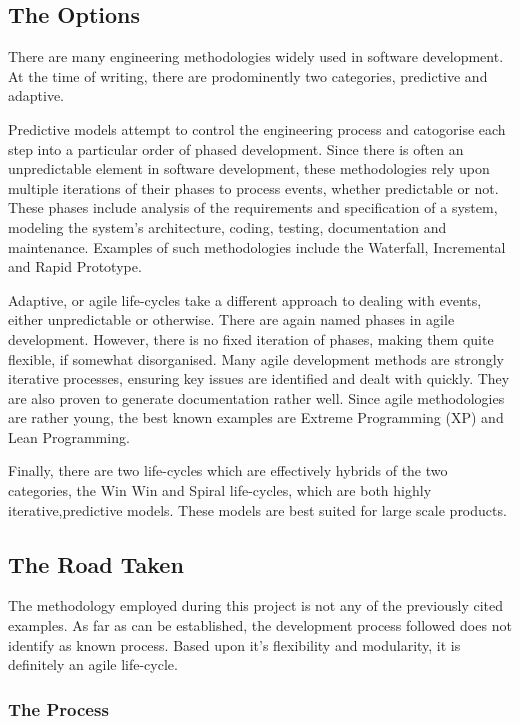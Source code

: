 
\subsection{The Options}

There are many engineering methodologies widely used in software
development. At the time of writing, there are prodominently two
categories, predictive and adaptive.


Predictive models attempt to control the engineering process and
catogorise each step into a particular order of phased development. 
Since there is often an unpredictable element in software development, 
these methodologies rely upon multiple iterations of their phases to 
process events, whether predictable or not. These phases include 
analysis of the requirements and specification of a system, modeling 
the system's architecture, coding, testing, documentation and 
maintenance. Examples of such methodologies include the Waterfall, 
Incremental and Rapid Prototype.


Adaptive, or agile life-cycles take a different approach to dealing 
with events, either unpredictable or otherwise. There are again named 
phases in agile development. However, there is no fixed iteration of 
phases, making them quite flexible, if somewhat disorganised. Many 
agile development methods are strongly iterative processes, ensuring key 
issues are identified and dealt with quickly. They are also proven to
generate documentation rather well. Since agile methodologies are rather 
young, the best known examples are Extreme Programming (XP) and Lean 
Programming.


Finally, there are two life-cycles which are effectively hybrids of the
two categories, the Win Win and Spiral life-cycles, which are both highly
iterative,predictive models. These models are best suited for large
scale products.

\subsection{The Road Taken}

The methodology employed during this project is not any of the
previously cited examples. As far as can be established, the development
process followed does not identify as known process. Based upon it's
flexibility and modularity, it is definitely an agile life-cycle.

\subsubsection{The Process}

